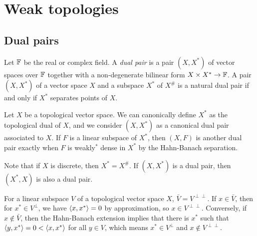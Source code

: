 \documentclass{../../large}
\begin{document}
\chapter{Weak topologies}
\section{Dual pairs}

\begin{prb}
Let $\mathbb{F}$ be the real or complex field.
A \emph{dual pair} is a pair $(X,X^*)$ of vector spaces over $\mathbb{F}$ together with a non-degenerate bilinear form $X\times X^*\to\mathbb{F}$.
A pair $(X,X^*)$ of a vector space $X$ and a subspace $X^*$ of $X^\#$ is a natural dual pair if and only if $X^*$ separates points of $X$.

Let $X$ be a topological vector space.
We can canonically define $X^*$ as the topological dual of $X$, and we consider $(X,X^*)$ as a canonical dual pair associated to $X$.
If $F$ is a linear subspace of $X^*$, then $(X,F)$ is another dual pair exactly when $F$ is weakly$^*$ dense in $X^*$ by the Hahn-Banach separation.

Note that if $X$ is discrete, then $X^*=X^\#$.
If $(X,X^*)$ is a dual pair, then $(X^*,X)$ is also a dual pair.
\end{prb}



\begin{pf}
For a linear subspace $V$ of a topological vector space $X$, $\bar V=V^{\perp\perp}$.
If $x\in\bar V$, then for $x^*\in V^\perp$, we have $\langle x,x^*\rangle=0$ by approximation, so $x\in V^{\perp\perp}$.
Conversely, if $x\notin\bar V$, then the Hahn-Banach extension implies that there is $x^*$ such that $\langle y,x^*\rangle=0<\langle x,x^*\rangle$ for all $y\in V$, which means $x^*\in V^\perp$ and $x\notin V^{\perp\perp}$.

\end{pf}
\end{document}
